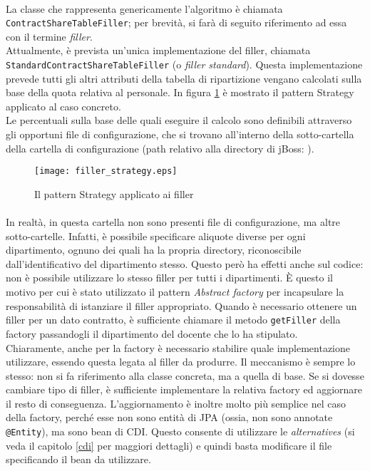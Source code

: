 \paragraph{}
La classe che rappresenta genericamente l'algoritmo è chiamata \lstinline{ContractShareTableFiller}; per brevità, si farà di seguito riferimento ad essa con il termine \textsl{filler}. \\
Attualmente, è prevista un'unica implementazione del filler, chiamata \lstinline{StandardContractShareTableFiller} (o \textsl{filler standard}). Questa implementazione prevede tutti gli altri attributi della tabella di ripartizione vengano calcolati sulla base della quota relativa al personale. In figura \ref{filler_strategy} è mostrato il pattern Strategy applicato al caso concreto.\\
Le percentuali sulla base delle quali eseguire il calcolo sono definibili attraverso gli opportuni file di configurazione, che si trovano all'interno della sotto-cartella  della cartella di configurazione (path relativo alla directory di jBoss: ). \\

\begin{figure}
\centering
\texttt{[image: filler\_strategy.eps]}
\caption{Il pattern Strategy applicato ai filler}
\label{filler_strategy}
\end{figure}

\paragraph{}
In realtà, in questa cartella non sono presenti file di configurazione, ma altre sotto-cartelle. Infatti, è possibile specificare aliquote diverse per ogni dipartimento, ognuno dei quali ha la propria directory, riconoscibile dall'identificativo del dipartimento stesso. Questo però ha effetti anche sul codice: non è possibile utilizzare lo stesso filler per tutti i dipartimenti. È questo il motivo per cui è stato utilizzato il pattern \textsl{Abstract factory} per incapsulare la responsabilità di istanziare il filler appropriato. Quando è necessario ottenere un filler per un dato contratto, è sufficiente chiamare il metodo \lstinline{getFiller} della factory passandogli il dipartimento del docente che lo ha stipulato. \\
Chiaramente, anche per la factory è necessario stabilire quale implementazione utilizzare, essendo questa legata al filler da produrre. Il meccanismo è sempre lo stesso: non si fa riferimento alla classe concreta, ma a quella di base. Se si dovesse cambiare tipo di filler, è sufficiente implementare la relativa factory ed aggiornare il resto di conseguenza. L'aggiornamento è inoltre molto più semplice nel caso della factory, perché esse non sono entità di JPA (ossia, non sono annotate \lstinline{@Entity}), ma sono bean di CDI. Questo consente di utilizzare le \textit{alternatives} (si veda il capitolo \ref{cdi} per maggiori dettagli) e quindi basta modificare il file  specificando il bean da utilizzare.\\

